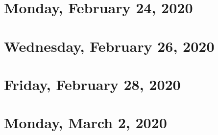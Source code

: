 \documentclass{../mynotes}
\begin{document}
\section{Monday, February 24, 2020}
	
\section{Wednesday, February 26, 2020}
    
\section{Friday, February 28, 2020}
    

\section{Monday, March 2, 2020}
	
%     
%     

% 	
%     
%     
\end{document}
